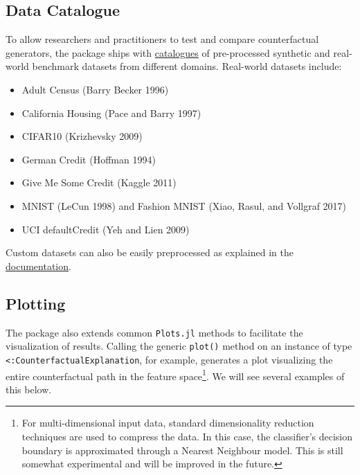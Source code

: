 \documentclass{juliacon}
\providecommand{\tightlist}{%
  \setlength{\itemsep}{0pt}\setlength{\parskip}{0pt}}\usepackage{longtable,booktabs,array}
\begin{document}
\twocolumn

\subsection{Data Catalogue}\label{data-catalogue}

To allow researchers and practitioners to test and compare
counterfactual generators, the package ships with
\href{https://juliatrustworthyai.github.io/CounterfactualExplanations.jl/v0.1/tutorials/data_catalogue/}{catalogues}
of pre-processed synthetic and real-world benchmark datasets from
different domains. Real-world datasets include:

\begin{itemize}
\tightlist
\item
  Adult Census (Barry Becker 1996)
\item
  California Housing (Pace and Barry 1997)
\item
  CIFAR10 (Krizhevsky 2009)
\item
  German Credit (Hoffman 1994)
\item
  Give Me Some Credit (Kaggle 2011)
\item
  MNIST (LeCun 1998) and Fashion MNIST (Xiao, Rasul, and Vollgraf 2017)
\item
  UCI defaultCredit (Yeh and Lien 2009)
\end{itemize}

Custom datasets can also be easily preprocessed as explained in the
\href{https://juliatrustworthyai.github.io/CounterfactualExplanations.jl/v0.1/tutorials/data_preprocessing/}{documentation}.

\subsection{Plotting}\label{plotting}

The package also extends common \texttt{Plots.jl} methods to facilitate
the visualization of results. Calling the generic \texttt{plot()} method
on an instance of type \texttt{\textless{}:CounterfactualExplanation},
for example, generates a plot visualizing the entire counterfactual path
in the feature space\footnote{For multi-dimensional input data, standard
  dimensionality reduction techniques are used to compress the data. In
  this case, the classifier's decision boundary is approximated through
  a Nearest Neighbour model. This is still somewhat experimental and
  will be improved in the future.}. We will see several examples of this
below.
\end{document}
